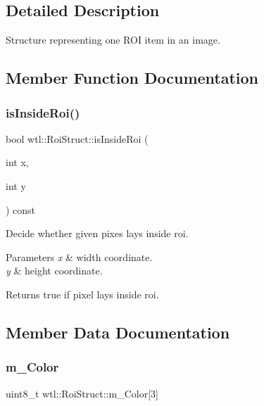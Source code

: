 \subsection{Detailed Description}
Structure representing one R\+OI item in an image. 

\subsection{Member Function Documentation}
\mbox{\label{structwtl_1_1_roi_struct_a0fc95c942e5745a8ff8dd076ccd52e6d}} 
\subsubsection{\texorpdfstring{is\+Inside\+Roi()}{isInsideRoi()}}
{\footnotesize\ttfamily bool wtl\+::\+Roi\+Struct\+::is\+Inside\+Roi (\begin{DoxyParamCaption}\item[{int}]{x,  }\item[{int}]{y }\end{DoxyParamCaption}) const}



Decide whether given pixes lays inside roi. 


\begin{DoxyParams}{Parameters}
{\em x} & width coordinate. \\
\hline
{\em y} & height coordinate. \\
\hline
\end{DoxyParams}
\begin{DoxyReturn}{Returns}
true if pixel lays inside roi. 
\end{DoxyReturn}


\subsection{Member Data Documentation}
\mbox{\label{structwtl_1_1_roi_struct_adacf81e095c9231ebf28aa7866b96234}} 
\subsubsection{\texorpdfstring{m\+\_\+\+Color}{m\_Color}}
{\footnotesize\ttfamily uint8\+\_\+t wtl\+::\+Roi\+Struct\+::m\+\_\+\+Color\mbox{[}3\mbox{]}}



